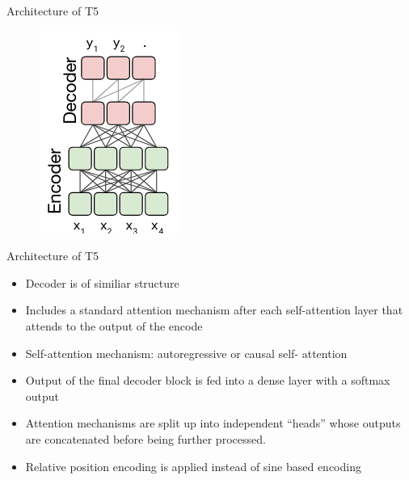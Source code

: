 \documentclass[english]{mlutalk}
\begin{document}
\begin{frame}{Architecture of T5}
    \begin{figure}
        \centering
        \includegraphics[height=0.75\textheight]{figures/t5_architecture.png}
    \end{figure}
\end{frame}

\begin{frame}{Architecture of T5}
  \begin{itemize}
    \item Decoder is of similiar structure
    \item Includes a standard attention mechanism after each self-attention layer that attends to the output of the encode
    \item Self-attention mechanism: autoregressive or causal self-
    attention
    \item Output of the final decoder block is fed into a dense layer with a softmax output
    \item Attention mechanisms are split up into
    independent “heads” whose outputs are concatenated before being further processed.
    \item Relative position encoding is applied instead of sine based encoding
  \end{itemize}
\end{frame}
\end{document}
